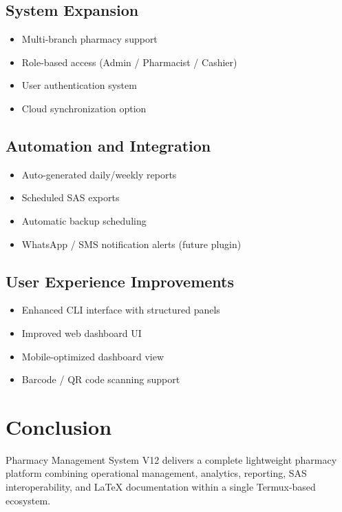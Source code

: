 \documentclass[12pt,a4paper]{article}
\begin{document}
\subsection{System Expansion}

\begin{itemize}
\item Multi-branch pharmacy support
\item Role-based access (Admin / Pharmacist / Cashier)
\item User authentication system
\item Cloud synchronization option
\end{itemize}

\subsection{Automation and Integration}

\begin{itemize}
\item Auto-generated daily/weekly reports
\item Scheduled SAS exports
\item Automatic backup scheduling
\item WhatsApp / SMS notification alerts (future plugin)
\end{itemize}

\subsection{User Experience Improvements}

\begin{itemize}
\item Enhanced CLI interface with structured panels
\item Improved web dashboard UI
\item Mobile-optimized dashboard view
\item Barcode / QR code scanning support
\end{itemize}




\section{Conclusion}

Pharmacy Management System V12 delivers a complete lightweight pharmacy platform combining operational management, analytics, reporting, SAS interoperability, and LaTeX documentation within a single Termux-based ecosystem.
\end{document}
